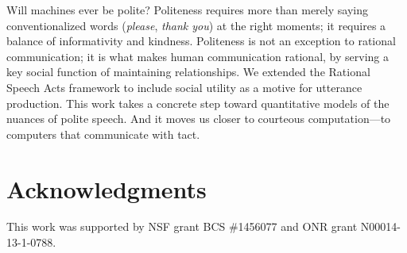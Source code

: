 \documentclass[10pt,letterpaper]{article}
\newcommand{\ndg}[1]{\textcolor{Green}{[ndg: #1]}}
\begin{document}

Will machines ever be polite?
Politeness requires more than merely saying conventionalized words (\emph{please}, \emph{thank you}) at the right moments; it requires a balance of informativity and kindness.
Politeness is not an exception to rational communication; it is what makes human communication rational, by serving a key social function of maintaining relationships.
We extended the Rational Speech Acts framework to include social utility as a motive for utterance production.
This work takes a concrete step toward quantitative models of the nuances of polite speech.
And it moves us closer to courteous computation---to computers that communicate with tact.

\section{Acknowledgments}

This work was supported by NSF grant BCS \#1456077 and ONR grant N00014-13-1-0788. 


\setlength{\bibleftmargin}{.125in}
\setlength{\bibindent}{-\bibleftmargin}


\end{document}
